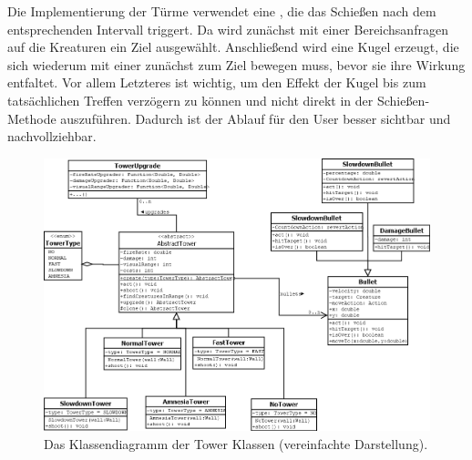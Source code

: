 Die Implementierung der Türme verwendet eine , die das Schießen nach dem entsprechenden Intervall triggert. Da wird zunächst mit einer Bereichsanfragen auf die Kreaturen ein Ziel ausgewählt. Anschließend wird eine Kugel erzeugt, die sich wiederum mit einer  zunächst zum Ziel bewegen muss, bevor sie ihre Wirkung entfaltet. Vor allem Letzteres ist wichtig, um den Effekt der Kugel bis zum tatsächlichen Treffen verzögern zu können und nicht direkt in der Schießen-Methode auszuführen. Dadurch ist der Ablauf für den User besser sichtbar und nachvollziehbar.

\begin{figure}[htb]
  \centering
  \includegraphics[width=\linewidth]{images/tower-class-diagramm.png}
  \caption{Das Klassendiagramm der Tower Klassen (vereinfachte Darstellung).}
\end{figure}


